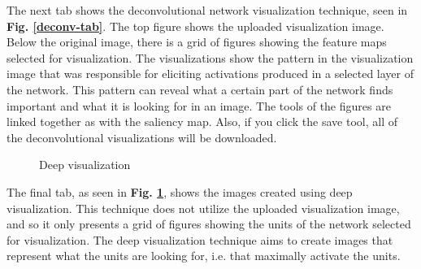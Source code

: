 \noindent The next tab shows the deconvolutional network visualization technique, seen in \textbf{Fig. \ref{deconv-tab}}. The top figure shows the uploaded visualization image. Below the original image, there is a grid of figures showing the feature maps selected for visualization. The visualizations show the pattern in the visualization image that was responsible for eliciting activations produced in a selected layer of the network. This pattern can reveal what a certain part of the network finds important and what it is looking for in an image. The tools of the figures are linked together as with the saliency map. Also, if you click the save tool, all of the deconvolutional visualizations will be downloaded.\\

\begin{figure}[!h]
    \centering
        \caption{Deep visualization}
        \label{deepvis-tab}
\end{figure}

\noindent The final tab, as seen in \textbf{Fig. \ref{deepvis-tab}}, shows the images created using deep visualization. This technique does not utilize the uploaded visualization image, and so it only presents a grid of figures showing the units of the network selected for visualization. The deep visualization technique aims to create images that represent what the units are looking for, i.e. that maximally activate the units.


\cleardoublepage